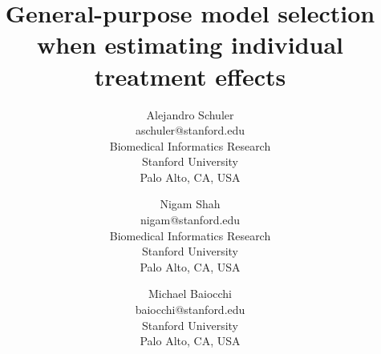 \documentclass{article}
\begin{document}
\title{General-purpose model selection when estimating individual treatment effects}

\author{Alejandro Schuler \\
	aschuler@stanford.edu \\
       Biomedical Informatics Research\\
       Stanford University\\
       Palo Alto, CA, USA 
          \and
     Nigam Shah \\
     nigam@stanford.edu \\
       Biomedical Informatics Research\\
       Stanford University\\
       Palo Alto, CA, USA 
                 \and
     Michael Baiocchi \\
     baiocchi@stanford.edu \\
       Stanford University\\
       Palo Alto, CA, USA}

\maketitle



 








\end{document}
